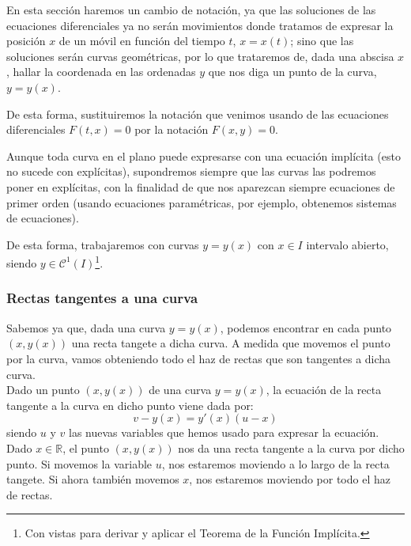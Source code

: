 \begin{notacion}
    En esta sección haremos un cambio de notación, ya que las soluciones de las ecuaciones diferenciales ya no serán movimientos donde tratamos de expresar la posición $x$ de un móvil en función del tiempo $t$, $x = x(t)$; sino que las soluciones serán curvas geométricas, por lo que trataremos de, dada una abscisa $x$, hallar la coordenada en las ordenadas $y$ que nos diga un punto de la curva, $y = y(x)$.

    De esta forma, sustituiremos la notación que venimos usando de las ecuaciones diferenciales $F(t,x) = 0$ por la notación $F(x,y) = 0$.
\end{notacion}

Aunque toda curva en el plano puede expresarse con una ecuación implícita (esto no sucede con explícitas), supondremos siempre que las curvas las podremos poner en explícitas, con la finalidad de que nos aparezcan siempre ecuaciones de primer orden (usando ecuaciones paramétricas, por ejemplo, obtenemos sistemas de ecuaciones).

De esta forma, trabajaremos con curvas $y=y(x)$ con $x\in I$ intervalo abierto, siendo $y\in \mathcal{C}^1(I)$\footnote{Con vistas para derivar y aplicar el Teorema de la Función Implícita.}.

\subsubsection{Rectas tangentes a una curva}
Sabemos ya que, dada una curva $y = y(x)$, podemos encontrar en cada punto $(x,y(x))$ una recta tangete a dicha curva. A medida que movemos el punto por la curva, vamos obteniendo todo el haz de rectas que son tangentes a dicha curva.\\

Dado un punto $(x,y(x))$ de una curva $y=y(x)$, la ecuación de la recta tangente a la curva en dicho punto viene dada por:
\begin{equation*}
    v-y(x) = y'(x) (u-x)
\end{equation*}
siendo $u$ y $v$ las nuevas variables que hemos usado para expresar la ecuación.\\

Dado $x\in \mathbb{R}$, el punto $(x,y(x))$ nos da una recta tangente a la curva por dicho punto. Si movemos la variable $u$, nos estaremos moviendo a lo largo de la recta tangete. Si ahora también movemos $x$, nos estaremos moviendo por todo el haz de rectas.

